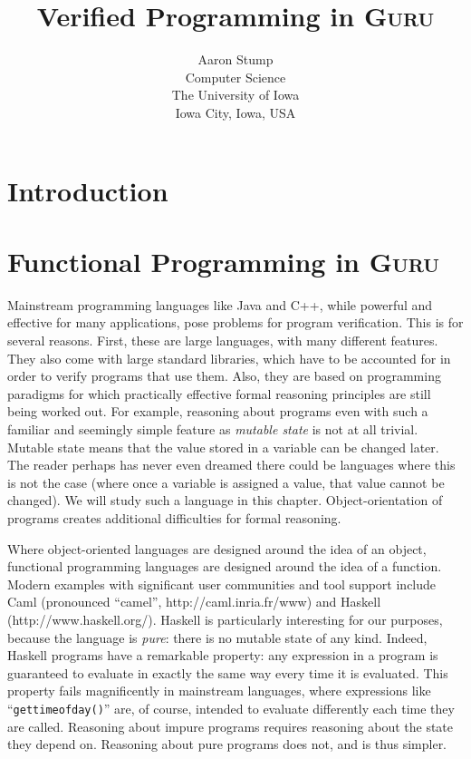 \documentclass{book}[12pt]
\newcommand{\guru}[0]{\textsc{Guru}}
\begin{document}
\title{Verified Programming in \guru}

\author{Aaron Stump \\
Computer Science \\
The University of Iowa \\
Iowa City, Iowa, USA
}

\maketitle

\tableofcontents

\chapter{Introduction}
\label{ch1}


\chapter{Functional Programming in \guru}
\label{ch:prog}

Mainstream programming languages like Java and C++, while powerful and
effective for many applications, pose problems for program
verification.  This is for several reasons.  First, these are large
languages, with many different features.  They also come with large
standard libraries, which have to be accounted for in order to verify
programs that use them.  Also, they are based on programming paradigms
for which practically effective formal reasoning principles are still
being worked out.  For example, reasoning about programs even with
such a familiar and seemingly simple feature as \emph{mutable state}
is not at all trivial.  Mutable state means that the value stored in a
variable can be changed later.  The reader perhaps has never even
dreamed there could be languages where this is not the case (where
once a variable is assigned a value, that value cannot be changed).
We will study such a language in this chapter.  Object-orientation of
programs creates additional difficulties for formal reasoning.

Where object-oriented languages are designed around the idea of an
object, functional programming languages are designed around the idea
of a function.  Modern examples with significant user communities and
tool support include Caml (pronounced ``camel'',
http://caml.inria.fr/www) and Haskell (http://www.haskell.org/).
Haskell is particularly interesting for our purposes, because the
language is \emph{pure}: there is no mutable state of any kind.
Indeed, Haskell programs have a remarkable property: any expression in
a program is guaranteed to evaluate in exactly the same way every time
it is evaluated.  This property fails magnificently in mainstream
languages, where expressions like ``\texttt{gettimeofday()}'' are, of
course, intended to evaluate differently each time they are
called.  Reasoning about impure programs requires reasoning about the
state they depend on.  Reasoning about pure programs does not, and is
thus simpler.  
\end{document}
